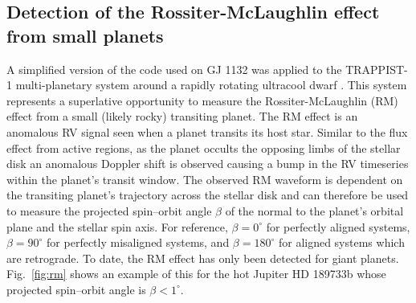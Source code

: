 \subsection{Detection of the Rossiter-McLaughlin effect from small planets}
A simplified version of the code used on GJ 1132 was applied to the TRAPPIST-1 
multi-planetary system around a rapidly rotating ultracool dwarf \parencite{gillon16}. 
This system represents a superlative opportunity to measure the Rossiter-McLaughlin (RM) 
effect from a small (likely rocky) transiting planet. The RM effect is an anomalous 
RV signal seen when a planet transits its host star. Similar to the flux effect from 
active regions, as the planet occults the opposing limbs of the stellar disk an 
anomalous Doppler shift is observed causing a bump in the RV timeseries within the 
planet's transit window. The observed RM waveform is dependent on the transiting planet's 
trajectory across the stellar disk and can therefore be used to measure the 
projected spin--orbit angle $\beta$ of the normal to the planet's orbital plane and the 
stellar spin axis. For reference, $\beta=0^{\circ}$ for perfectly aligned systems, 
$\beta=90^{\circ}$ for perfectly misaligned systems, and $\beta=180^{\circ}$ for aligned systems 
which are retrograde. 
To date, the RM effect has only been detected for giant planets. 
Fig.~\ref{fig:rm} shows an example of this for the hot Jupiter HD 189733b whose 
projected spin--orbit angle is $\beta < 1^{\circ}$. \\

